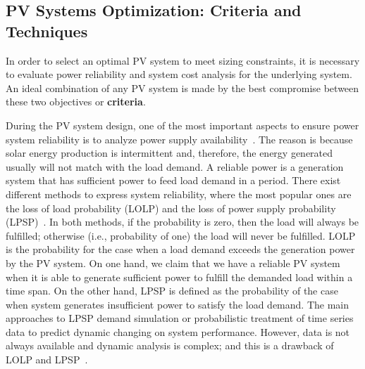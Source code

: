 \documentclass[journal]{IEEEtran}
\begin{document}
\subsection{PV Systems Optimization: Criteria and Techniques}

In order to select an optimal PV system to meet sizing constraints, it is necessary to evaluate power reliability and system cost analysis for the underlying system. An ideal combination of any PV system is made by the best compromise between these two objectives or \textbf{criteria}.

During the PV system design, one of the most important aspects to ensure power system reliability is to analyze power supply availability~\cite{Alsadi2018}. The reason is because solar energy production is intermittent and, therefore, the energy generated usually will not match with the load demand. A reliable power is a generation system that has sufficient power to feed load demand in a period. There exist different methods to express system reliability, where the most popular ones are the loss of load probability (LOLP) and the loss of power supply probability (LPSP)~\cite{Alsadi2018}. In both methods, if the probability is zero, then the load will always be fulfilled; otherwise (i.e., probability of one) the load will never be fulfilled. LOLP is the probability for the case when a load demand exceeds the generation power by the PV system. On one hand, we claim that we have a reliable PV system when it is able to generate sufficient power to fulfill the demanded load within a time span. On the other hand, LPSP is defined as the probability of the case when system generates insufficient power to satisfy the load demand. The main approaches to LPSP demand simulation or probabilistic treatment of time series data to predict dynamic changing on system performance. However, data is not always available and dynamic analysis is complex; and this is a drawback of LOLP and LPSP~\cite{Alsadi2018}.
\end{document}
